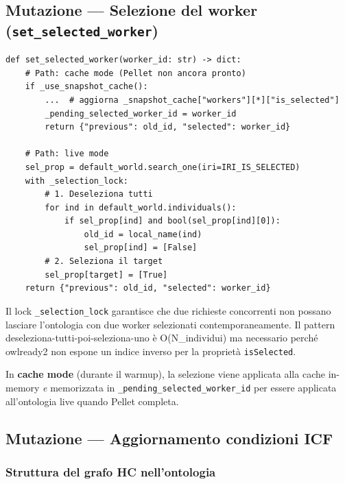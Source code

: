 \documentclass[a4paper,12pt]{article}
\begin{document}
\subsection{Mutazione --- Selezione del worker (\texttt{set\_selected\_worker})}

\begin{lstlisting}[caption={Mutazione atomica di \texttt{isSelected}.}]
def set_selected_worker(worker_id: str) -> dict:
    # Path: cache mode (Pellet non ancora pronto)
    if _use_snapshot_cache():
        ...  # aggiorna _snapshot_cache["workers"][*]["is_selected"]
        _pending_selected_worker_id = worker_id
        return {"previous": old_id, "selected": worker_id}

    # Path: live mode
    sel_prop = default_world.search_one(iri=IRI_IS_SELECTED)
    with _selection_lock:
        # 1. Deseleziona tutti
        for ind in default_world.individuals():
            if sel_prop[ind] and bool(sel_prop[ind][0]):
                old_id = local_name(ind)
                sel_prop[ind] = [False]
        # 2. Seleziona il target
        sel_prop[target] = [True]
    return {"previous": old_id, "selected": worker_id}
\end{lstlisting}

\noindent Il lock \texttt{\_selection\_lock} garantisce che due richieste concorrenti
non possano lasciare l'ontologia con due worker selezionati
contemporaneamente. Il pattern deseleziona-tutti-poi-seleziona-uno
\`{e} O(N\_individui) ma necessario perch\'{e} owlready2 non espone
un indice inverso per la propriet\`{a} \texttt{isSelected}.

In \textbf{cache mode} (durante il warmup), la selezione viene applicata
alla cache in-memory \textit{e} memorizzata in
\texttt{\_\allowbreak{}pending\_\allowbreak{}selected\_\allowbreak{}worker\_\allowbreak{}id} per essere applicata
all'ontologia live quando Pellet completa.

\subsection{Mutazione --- Aggiornamento condizioni ICF}

\subsubsection{Struttura del grafo HC nell'ontologia}
\end{document}
